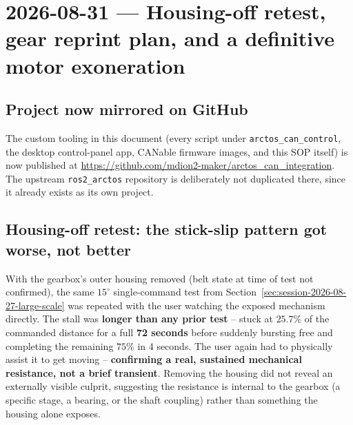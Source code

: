 \documentclass[11pt,letterpaper]{article}
\begin{document}
\section{2026-08-31 --- Housing-off retest, gear reprint plan, and a definitive motor exoneration}
\label{sec:session-2026-08-31}

\subsection{Project now mirrored on GitHub}
The custom tooling in this document (every script under \texttt{arctos\_can\_control}, the desktop control-panel app, CANable firmware images, and this SOP itself) is now published at \url{https://github.com/mdion2-maker/arctos_can_integration}. The upstream \texttt{ros2\_arctos} repository is deliberately not duplicated there, since it already exists as its own project.

\subsection{Housing-off retest: the stick-slip pattern got worse, not better}
With the gearbox's outer housing removed (belt state at time of test not confirmed), the same $15^\circ$ single-command test from Section~\ref{sec:session-2026-08-27-large-scale} was repeated with the user watching the exposed mechanism directly. The stall was \textbf{longer than any prior test} -- stuck at $25.7\%$ of the commanded distance for a full \textbf{72 seconds} before suddenly bursting free and completing the remaining $75\%$ in 4 seconds. The user again had to physically assist it to get moving -- \textbf{confirming a real, sustained mechanical resistance, not a brief transient}. Removing the housing did not reveal an externally visible culprit, suggesting the resistance is internal to the gearbox (a specific stage, a bearing, or the shaft coupling) rather than something the housing alone exposes.
\end{document}

